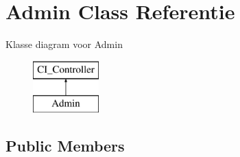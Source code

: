 \hypertarget{class_admin}{}\section{Admin Class Referentie}
\label{class_admin}
Klasse diagram voor Admin\begin{figure}[H]
\begin{center}
\leavevmode
\includegraphics[height=2.000000cm]{class_admin}
\end{center}
\end{figure}
\subsection*{Public Members}
